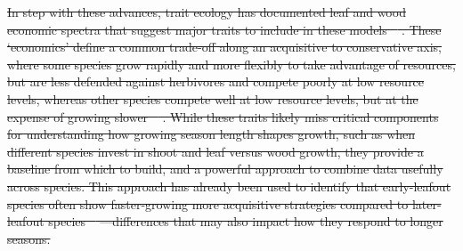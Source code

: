 \documentclass[11pt]{article}
\providecommand{\DIFdeltex}[1]{{\protect\color{red}\sout{#1}}}                      %
\providecommand{\DIFdelbegin}{} %
\providecommand{\DIFdelend}{} %
\providecommand{\DIFdel}[1]{\texorpdfstring{\DIFdeltex{#1}}{}} %
\newcommand{\DIFscaledelfig}{0.5}
\newlength{\DIFdelgraphicswidth} %
\newlength{\DIFdelgraphicsheight} %
\newcommand{\DIFdelincludegraphics}[2][]{%
\sbox{\DIFdelgraphicsbox}{\DIFOincludegraphics[#1]{#2}}%
\settoboxwidth{\DIFdelgraphicswidth}{\DIFdelgraphicsbox} %
\settoboxtotalheight{\DIFdelgraphicsheight}{\DIFdelgraphicsbox} %
\scalebox{\DIFscaledelfig}{%
\parbox[b]{\DIFdelgraphicswidth}{\usebox{\DIFdelgraphicsbox}\\[-\baselineskip] \rule{\DIFdelgraphicswidth}{0em}}\llap{\resizebox{\DIFdelgraphicswidth}{\DIFdelgraphicsheight}{%
\setlength{\unitlength}{\DIFdelgraphicswidth}%
\begin{picture}(1,1)%
\thicklines\linethickness{2pt} %
{\color[rgb]{1,0,0}\put(0,0){\framebox(1,1){}}}%
{\color[rgb]{1,0,0}\put(0,0){\line( 1,1){1}}}%
{\color[rgb]{1,0,0}\put(0,1){\line(1,-1){1}}}%
\end{picture}%
}\hspace*{3pt}}} %
} %
\DeclareRobustCommand{\DIFdelbegin}{\DIFOdelbegin \let\includegraphics\DIFdelincludegraphics} %
\DeclareRobustCommand{\DIFdelend}{\DIFOaddend \let\includegraphics\DIFOincludegraphics} %
\begin{document}
\DIFdelbegin \DIFdel{In step with these advances, trait ecology has documented leaf and wood economic spectra that suggest major traits to include in these models \mbox{%
\citep[with related databases of these traits often available,][]{Chave2009,diaz2016}}\hskip0pt%
. These `economics' define a common trade-off along an acquisitive to conservative axis, where some species grow rapidly and more flexibly to take advantage of resources, but are less defended against herbivores and compete poorly at low resource levels, whereas other species compete well at low resource levels, but at the expense of growing slower  \mbox{%
\citep[][]{Grime:1977sw,Chave2009,diaz2016}}\hskip0pt%
. While these traits likely miss critical components for understanding how growing season length shapes growth, such as when different species invest in shoot and leaf versus wood growth, they provide a baseline from which to build, and a powerful approach to combine data usefully across species. This approach has already been used to identify that early-leafout species often show faster-growing more acquisitive strategies compared to later-leafout species \mbox{%
\citep[reviewed in][]{cleland2024effects}}\hskip0pt%
---differences that may also impact how they respond to longer seasons. 
}\DIFdelend %
\end{document}
